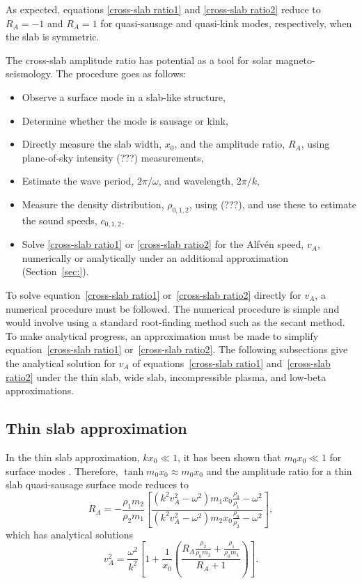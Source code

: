 \documentclass[namedreferences]{solarphysics}
\numberwithin{equation}{section}
\begin{document}
\begin{article}
As expected, equations \eqref{cross-slab ratio1} and \eqref{cross-slab ratio2} reduce to $R_A = -1$ and $R_A = 1$ for quasi-sausage and quasi-kink modes, respectively, when the slab is symmetric.

The cross-slab amplitude ratio has potential as a tool for solar magneto-seismology. The procedure goes as follows:
\begin{itemize}
\item Observe a surface mode in a slab-like structure,
\item Determine whether the mode is sausage or kink,
\item Directly measure the slab width, $x_0$, and the amplitude ratio, $R_A$, using plane-of-sky intensity (???) measurements,
\item Estimate the wave period, $2\pi / \omega$, and wavelength, $2\pi / k$,
\item Measure the density distribution, $\rho_{0,1,2}$, using (???), and use these to estimate the sound speeds, $c_{0,1,2}$.
\item Solve \eqref{cross-slab ratio1} or \eqref{cross-slab ratio2} for the Alfv\'{e}n speed, $v_A$, numerically or analytically under an additional approximation (Section~\ref{sec:}).
\end{itemize}

To solve equation~\eqref{cross-slab ratio1} or~\eqref{cross-slab ratio2} directly for $v_A$, a numerical procedure must be followed. The numerical procedure is simple and would involve using a standard root-finding method such as the secant method. To make analytical progress, an approximation must be made to simplify equation~\eqref{cross-slab ratio1} or~\eqref{cross-slab ratio2}. The following subsections give the analytical solution for $v_A$ of equations~\eqref{cross-slab ratio1} and~\eqref{cross-slab ratio2} under the thin slab, wide slab, incompressible plasma, and low-beta approximations.

\subsection{Thin slab approximation}
In the thin slab approximation, $kx_0 \ll 1$, it has been shown that $m_0x_0 \ll 1$ for surface modes \citep{rob81b}. Therefore, $\tanh{m_0x_0} \approx m_0x_0$ and the amplitude ratio for a thin slab quasi-sausage surface mode reduces to
\begin{equation}
R_A = -\frac{\rho_1m_2}{\rho_2m_1}\left[\frac{(k^2v_A^2-\omega^2)m_1x_0\frac{\rho_0}{\rho_1}-\omega^2}{(k^2v_A^2-\omega^2)m_2x_0\frac{\rho_0}{\rho_2}-\omega^2}\right], 
\end{equation}
which has analytical solutions
\begin{equation}
v_A^2 = \frac{\omega^2}{k^2} \left[1 + \frac{1}{x_0}\left(\frac{R_A\frac{\rho_2}{\rho_0m_2} + \frac{\rho_1}{\rho_0m_1}}{R_A + 1}\right)\right].
\end{equation}


\end{article}
\end{document}
